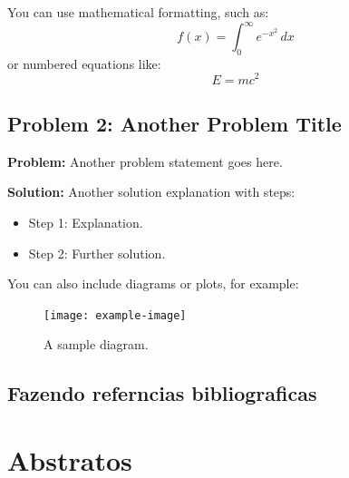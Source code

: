 You can use mathematical formatting, such as:
\[
f(x) = \int_{0}^{\infty} e^{-x^2} \, dx
\]
or numbered equations like:
\begin{equation}
    E = mc^2
\end{equation}

\newpage

\subsection{Problem 2: Another Problem Title}
\textbf{Problem:} Another problem statement goes here.

\vspace{1em}

\textbf{Solution:} Another solution explanation with steps:
\begin{itemize}
    \item Step 1: Explanation.
    \item Step 2: Further solution.
\end{itemize}

You can also include diagrams or plots, for example:
\begin{figure}[h]
    \centering
    \texttt{[image: example-image]} %
    \caption{A sample diagram.}
    \label{fig:sample-diagram}
\end{figure}

\newpage

\subsection{Fazendo referncias bibliograficas}



\lipsum[3]

\section*{Abstratos}

\lipsum[3]

\newpage